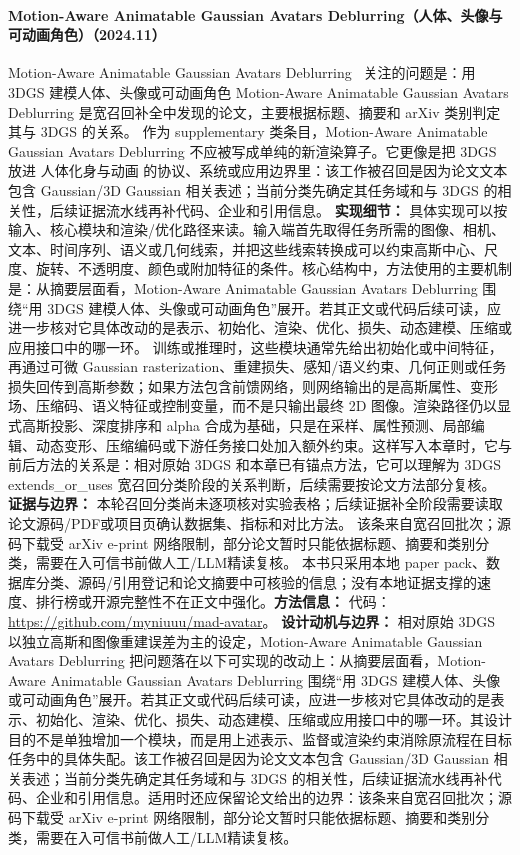 \paragraph{Motion-Aware Animatable Gaussian Avatars Deblurring（人体、头像与可动画角色）（2024.11）}
Motion-Aware Animatable Gaussian Avatars Deblurring~\cite{2411_16758} 关注的问题是：用 3DGS 建模人体、头像或可动画角色 Motion-Aware Animatable Gaussian Avatars Deblurring 是宽召回补全中发现的论文，主要根据标题、摘要和 arXiv 类别判定其与 3DGS 的关系。
作为 supplementary 类条目，Motion-Aware Animatable Gaussian Avatars Deblurring 不应被写成单纯的新渲染算子。它更像是把 3DGS 放进 人体化身与动画 的协议、系统或应用边界里：该工作被召回是因为论文文本包含 Gaussian/3D Gaussian 相关表述；当前分类先确定其任务域和与 3DGS 的相关性，后续证据流水线再补代码、企业和引用信息。
\textbf{实现细节：} 具体实现可以按输入、核心模块和渲染/优化路径来读。输入端首先取得任务所需的图像、相机、文本、时间序列、语义或几何线索，并把这些线索转换成可以约束高斯中心、尺度、旋转、不透明度、颜色或附加特征的条件。核心结构中，方法使用的主要机制是：从摘要层面看，Motion-Aware Animatable Gaussian Avatars Deblurring 围绕“用 3DGS 建模人体、头像或可动画角色”展开。若其正文或代码后续可读，应进一步核对它具体改动的是表示、初始化、渲染、优化、损失、动态建模、压缩或应用接口中的哪一环。 训练或推理时，这些模块通常先给出初始化或中间特征，再通过可微 Gaussian rasterization、重建损失、感知/语义约束、几何正则或任务损失回传到高斯参数；如果方法包含前馈网络，则网络输出的是高斯属性、变形场、压缩码、语义特征或控制变量，而不是只输出最终 2D 图像。渲染路径仍以显式高斯投影、深度排序和 alpha 合成为基础，只是在采样、属性预测、局部编辑、动态变形、压缩编码或下游任务接口处加入额外约束。这样写入本章时，它与前后方法的关系是：相对原始 3DGS 和本章已有锚点方法，它可以理解为 3DGS extends\_or\_uses 宽召回分类阶段的关系判断，后续需要按论文方法部分复核。
\textbf{证据与边界：} 本轮召回分类尚未逐项核对实验表格；后续证据补全阶段需要读取论文源码/PDF或项目页确认数据集、指标和对比方法。 该条来自宽召回批次；源码下载受 arXiv e-print 网络限制，部分论文暂时只能依据标题、摘要和类别分类，需要在入可信书前做人工/LLM精读复核。 本书只采用本地 paper pack、数据库分类、源码/引用登记和论文摘要中可核验的信息；没有本地证据支撑的速度、排行榜或开源完整性不在正文中强化。\textbf{方法信息：} 代码：\url{https://github.com/myniuuu/mad-avatar}。
\textbf{设计动机与边界：} 相对原始 3DGS 以独立高斯和图像重建误差为主的设定，Motion-Aware Animatable Gaussian Avatars Deblurring 把问题落在以下可实现的改动上：从摘要层面看，Motion-Aware Animatable Gaussian Avatars Deblurring 围绕“用 3DGS 建模人体、头像或可动画角色”展开。若其正文或代码后续可读，应进一步核对它具体改动的是表示、初始化、渲染、优化、损失、动态建模、压缩或应用接口中的哪一环。其设计目的不是单独增加一个模块，而是用上述表示、监督或渲染约束消除原流程在目标任务中的具体失配。该工作被召回是因为论文文本包含 Gaussian/3D Gaussian 相关表述；当前分类先确定其任务域和与 3DGS 的相关性，后续证据流水线再补代码、企业和引用信息。适用时还应保留论文给出的边界：该条来自宽召回批次；源码下载受 arXiv e-print 网络限制，部分论文暂时只能依据标题、摘要和类别分类，需要在入可信书前做人工/LLM精读复核。
